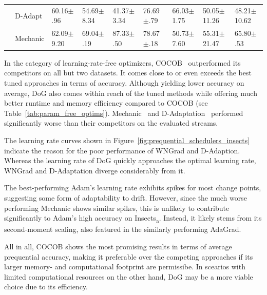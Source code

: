 \documentclass{article} %
\begin{document}
\begin{table}[t]
\begin{tabular}{lllllllll}
                                                         & D-Adapt   & 60.16$\pm$.96              & 54.69$\pm$8.34            & 41.37$\pm$3.34             & 76.69$\pm$.79             & 66.03$\pm$1.75          & 50.05$\pm$11.26          & 48.21$\pm$10.62          \\
                                                         & Mechanic  & 62.09$\pm$9.20             & 69.04$\pm$.19             & 87.33$\pm$.50              & 78.67$\pm$.18             & 50.73$\pm$7.60          & 55.31$\pm$21.47          & 65.80$\pm$.53            \\
      \bottomrule
   \end{tabular}
   \label{tab:results_adaptive_optims}
\end{table}
In the category of learning-rate-free optimizers, COCOB~\citep{orabonaTrainingDeepNetworks2017} outperformed its competitors on all but two datasets.
It comes close to or even exceeds the best tuned approaches in terms of accuracy.
Although yielding lower accuracy on average, DoG also comes within reach of the tuned methods while offering much better runtime and memory efficiency compared to COCOB (see Table~\ref{tab:param_free_optims}).
Mechanic~\citep{cutkoskyMechanicLearningRate2023} and D-Adaptation~\citep{defazioLearningRateFreeLearningDAdaptation2023a} performed significantly worse than their competitors on the evaluated streams.

The learning rate curves shown in Figure~\ref{fig:prequential_schedulers_insects} indicate the reason for the poor performance of WNGrad and D-Adaption.
Whereas the learning rate of DoG quickly approaches the optimal learning rate, WNGrad and D-Adaptation diverge considerably from it.

The best-performing Adam's learning rate exhibits spikes for most change points, suggesting some form of adaptability to drift.
However, since the much worse performing Mechanic shows similar spikes, this is unlikely to contribute significantly to Adam's high accuracy on Insects\textsubscript{a}.
Instead, it likely stems from its second-moment scaling, also featured in the similarly performing AdaGrad.

All in all, COCOB shows the most promising results in terms of average prequential accuracy, making it preferable over the competing approaches if its larger memory- and computational footprint are permissibe.
In scearios with limited computational resources on the other hand, DoG may be a more viable choice due to its efficiency.
\end{document}
